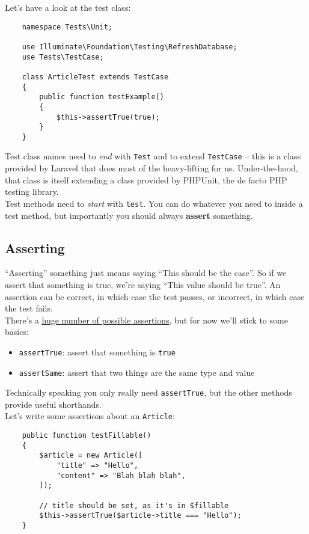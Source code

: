 Let's have a look at the test class:

\begin{verbatim}
    namespace Tests\Unit;

    use Illuminate\Foundation\Testing\RefreshDatabase;
    use Tests\TestCase;

    class ArticleTest extends TestCase
    {
        public function testExample()
        {
            $this->assertTrue(true);
        }
    }
\end{verbatim}

Test class names need to \textit{end} with \texttt{Test} and to extend \texttt{TestCase} – this is a class provided by Laravel that does most of the heavy-lifting for us. Under-the-hood, that class is itself extending a class provided by PHPUnit, the de facto PHP testing library.
\\

Test methods need to \textit{start} with \texttt{test}. You can do whatever you need to inside a test method, but importantly you should always \textbf{assert} something.

\subsection{Asserting}

``Asserting'' something just means saying ``This should be the case''. So if we assert that something is true, we're saying ``This value should be true''. An assertion can be correct, in which case the test passes, or incorrect, in which case the test fails.
\\

There's a \href{https://phpunit.readthedocs.io/en/9.0/assertions.html}{huge number of possible assertions}, but for now we'll stick to some basics:

\begin{itemize}
    \item \texttt{assertTrue}: assert that something is \texttt{true}
    \item \texttt{assertSame}: assert that two things are the same type and value
\end{itemize}

Technically speaking you only really need \texttt{assertTrue}, but the other methods provide useful shorthands.
\\

Let's write some assertions about an \texttt{Article}:

\begin{verbatim}
    public function testFillable()
    {
        $article = new Article([
            "title" => "Hello",
            "content" => "Blah blah blah",
        ]);

        // title should be set, as it's in $fillable
        $this->assertTrue($article->title === "Hello");
    }
\end{verbatim}


